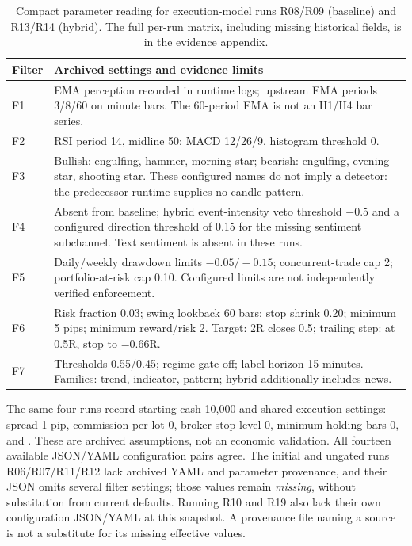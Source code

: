 \begin{table}[htbp]
\centering
\caption{Compact parameter reading for execution-model runs R08/R09 (baseline) and R13/R14 (hybrid). The full per-run matrix, including missing historical fields, is in the evidence appendix.}
\label{tab:intermediate-filter-parameters}
\small
\begin{tabular}{p{1.1cm}p{12.2cm}}
\toprule
\textbf{Filter} & \textbf{Archived settings and evidence limits} \\
\midrule
F1 & EMA perception recorded in runtime logs; upstream EMA periods 3/8/60 on minute bars. The 60-period EMA is not an H1/H4 bar series. \\
F2 & RSI period 14, midline 50; MACD 12/26/9, histogram threshold 0. \\
F3 & Bullish: engulfing, hammer, morning star; bearish: engulfing, evening star, shooting star. These configured names do not imply a detector: the predecessor runtime supplies no candle pattern. \\
F4 & Absent from baseline; hybrid event-intensity veto threshold $-0.5$ and a configured direction threshold of 0.15 for the missing sentiment subchannel. Text sentiment is absent in these runs. \\
F5 & Daily/weekly drawdown limits $-0.05/-0.15$; concurrent-trade cap 2; portfolio-at-risk cap 0.10. Configured limits are not independently verified enforcement. \\
F6 & Risk fraction 0.03; swing lookback 60 bars; stop shrink 0.20; minimum 5 pips; minimum reward/risk 2. Target: 2R closes 0.5; trailing step: at 0.5R, stop to $-0.66$R. \\
F7 & Thresholds 0.55/0.45; regime gate off; label horizon 15 minutes. Families: trend, indicator, pattern; hybrid additionally includes news. \\
\bottomrule
\end{tabular}
\end{table}

The same four runs record starting cash 10,000 and shared execution settings: spread 1 pip, commission per lot 0, broker stop level 0, minimum holding bars 0, and . These are archived assumptions, not an economic validation. All fourteen available JSON/YAML configuration pairs agree. The initial and ungated runs R06/R07/R11/R12 lack archived YAML and parameter provenance, and their JSON omits several filter settings; those values remain \textit{missing}, without substitution from current defaults. Running R10 and R19 also lack their own configuration JSON/YAML at this snapshot. A provenance file naming a source is not a substitute for its missing effective values.

